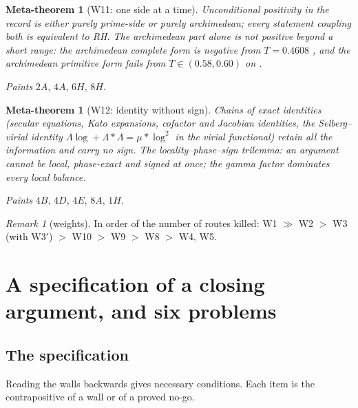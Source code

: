 \documentclass[11pt]{amsart}
\newtheorem{metatheorem}[theorem]{Meta-theorem}
\theoremstyle{definition}
\theoremstyle{remark}
\newtheorem{remark}[theorem]{Remark}
\begin{document}
\begin{metatheorem}[W11: one side at a time]\label{W11}
Unconditional positivity in the record is either purely prime-side or purely archimedean; every statement
coupling both is equivalent to RH. The archimedean part alone is not positive beyond a short range:
the archimedean complete form is negative from $T=0.4608$ \cite[Prop.~10.7]{Paper47}, and the archimedean
primitive form fails from $T\in(0.58,0.60)$ on \cite[Thm.~12.5(i)]{Paper47}.
\end{metatheorem}
\noindent \emph{Paints} $2A$, $4A$, $6H$, $8H$.

\begin{metatheorem}[W12: identity without sign]\label{W12}
Chains of exact identities (secular equations, Kato expansions, cofactor and Jacobian identities, the
Selberg--virial identity $\Lambda\log+\Lambda*\Lambda=\mu*\log^2$ in the virial functional) retain all the
information and carry no sign. The locality--phase--sign trilemma: an argument cannot be local, phase-exact
and signed at once; the gamma factor dominates every local balance.
\end{metatheorem}
\noindent \emph{Paints} $4B$, $4D$, $4E$, $8A$, $1H$.

\begin{remark}[weights]
In order of the number of routes killed: W1 $\gg$ W2 $>$ W3 (with W3$'$) $>$ W10 $>$ W9 $>$ W8 $>$ W4, W5.
\end{remark}

\section{A specification of a closing argument, and six problems}\label{sec:spec}

\subsection{The specification}
Reading the walls backwards gives necessary conditions. Each item is the contrapositive of a wall or of a
proved no-go.
\end{document}

